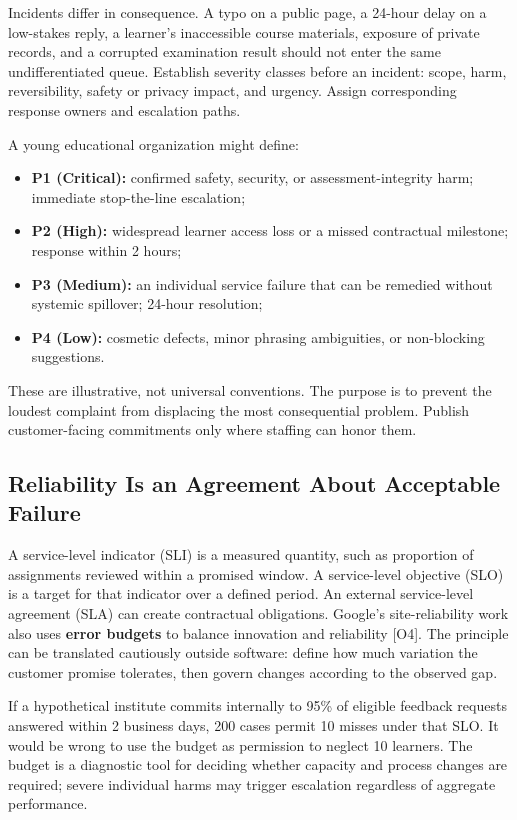 Incidents differ in consequence. A typo on a public page, a 24-hour delay on a low-stakes reply, a learner's inaccessible course materials, exposure of private records, and a corrupted examination result should not enter the same undifferentiated queue. Establish severity classes before an incident: scope, harm, reversibility, safety or privacy impact, and urgency. Assign corresponding response owners and escalation paths.

A young educational organization might define:
\begin{itemize}
    \item \textbf{P1 (Critical):} confirmed safety, security, or assessment-integrity harm; immediate stop-the-line escalation;
    \item \textbf{P2 (High):} widespread learner access loss or a missed contractual milestone; response within 2 hours;
    \item \textbf{P3 (Medium):} an individual service failure that can be remedied without systemic spillover; 24-hour resolution;
    \item \textbf{P4 (Low):} cosmetic defects, minor phrasing ambiguities, or non-blocking suggestions.
\end{itemize}

These are illustrative, not universal conventions. The purpose is to prevent the loudest complaint from displacing the most consequential problem. Publish customer-facing commitments only where staffing can honor them.

\subsection{Reliability Is an Agreement About Acceptable Failure}
\label{sec:reliability_and_error_budgets}

A service-level indicator (SLI) is a measured quantity, such as proportion of assignments reviewed within a promised window. A service-level objective (SLO) is a target for that indicator over a defined period. An external service-level agreement (SLA) can create contractual obligations. Google's site-reliability work also uses \textbf{error budgets} to balance innovation and reliability [O4]. The principle can be translated cautiously outside software: define how much variation the customer promise tolerates, then govern changes according to the observed gap.

If a hypothetical institute commits internally to 95\% of eligible feedback requests answered within 2 business days, 200 cases permit 10 misses under that SLO. It would be wrong to use the budget as permission to neglect 10 learners. The budget is a diagnostic tool for deciding whether capacity and process changes are required; severe individual harms may trigger escalation regardless of aggregate performance.

